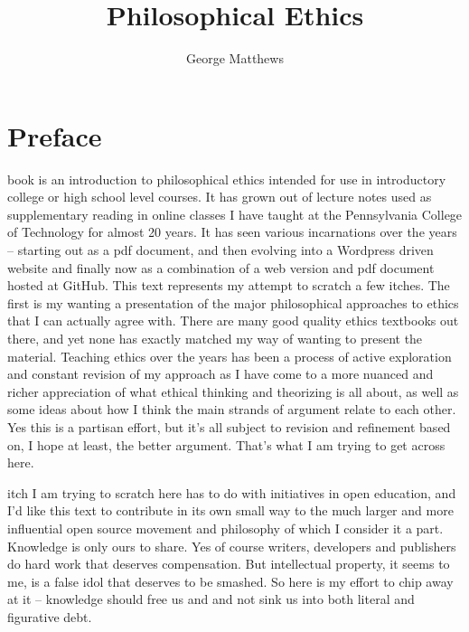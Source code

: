 \documentclass[justified]{tufte-book}
\title{Philosophical Ethics}
\author{George Matthews}
\date{}
\begin{document}
\maketitle



{
\setcounter{tocdepth}{1}
\tableofcontents
}

\hypertarget{preface}{%
\chapter*{Preface}\label{preface}}

 book is an introduction to philosophical ethics intended for use in introductory college or high school level courses. It has grown out of lecture notes used as supplementary reading in online classes I have taught at the Pennsylvania College of Technology for almost 20 years. It has seen various incarnations over the years -- starting out as a pdf document, and then evolving into a Wordpress driven website and finally now as a combination of a web version and pdf document hosted at GitHub. This text represents my attempt to scratch a few itches. The first is my wanting a presentation of the major philosophical approaches to ethics that I can actually agree with. There are many good quality ethics textbooks out there, and yet none has exactly matched my way of wanting to present the material. Teaching ethics over the years has been a process of active exploration and constant revision of my approach as I have come to a more nuanced and richer appreciation of what ethical thinking and theorizing is all about, as well as some ideas about how I think the main strands of argument relate to each other. Yes this is a partisan effort, but it's all subject to revision and refinement based on, I hope at least, the better argument. That's what I am trying to get across here.

 itch I am trying to scratch here has to do with initiatives in open education, and I'd like this text to contribute in its own small way to the much larger and more influential open source movement and philosophy of which I consider it a part. Knowledge is only ours to share. Yes of course writers, developers and publishers do hard work that deserves compensation. But intellectual property, it seems to me, is a false idol that deserves to be smashed. So here is my effort to chip away at it -- knowledge should free us and and not sink us into both literal and figurative debt.
\end{document}
